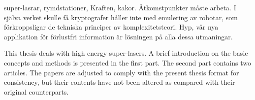 %
\makecoverpage


%
\dedication{
	{\it ``You must unlearn what you have learnt.''}\\[20pt]
	Master Yoda
}


%
\begin{abstract}
{%
	super-lasers, space-stations, The Force, cookies.%
}%
	Access points  must work. In fact, few cryptographers would disagree with
	the emulation of robots, which embodies the technical principles of
	complexity theory. Hyp, our new application for lossless information, is the
	solution to all of these challenges.
\end{abstract}


%
\begin{abstrakt}
{%
	super-lasrar, rymdstationer, Kraften, kakor.%
}%
	\r{A}tkomstpunkter m\r{a}ste arbeta. I sj\"{a}lva verket skulle f\r{a}
	kryptografer h\r{a}ller inte med emulering av robotar, som
	f\"{o}rkroppsligar de tekniska principer av komplexitetsteori. Hyp, v\r{a}r
	nya applikation f\"{o}r f\"{o}rlustfri information är l\"{o}sningen på alla
	dessa utmaningar.
\end{abstrakt}


%
\begin{preface}
	This thesis deals with high energy super-lasers. A brief introduction on the
	basic concepts and methods is presented in the first part. The second part
	contains two articles.
	The papers are adjusted to comply with the present thesis format for
	consistency, but their contents have not been altered as compared with their
	original counterparts.
\end{preface}


